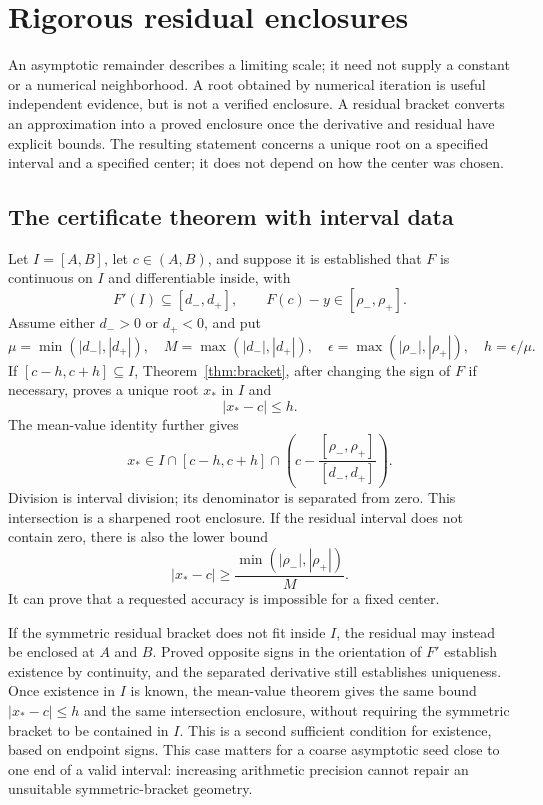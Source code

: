 \section{Rigorous residual enclosures}
\label{sec:executable-certificates}

An asymptotic remainder describes a limiting scale; it need not supply a
constant or a numerical neighborhood. A root obtained by numerical iteration
is useful independent evidence, but is not a verified enclosure.
A residual bracket converts an approximation into a proved enclosure once the derivative and residual have explicit bounds. The resulting statement concerns a unique root on a specified interval and a specified center; it does not depend on how the center was chosen.

\subsection{The certificate theorem with interval data}

Let $I=[A,B]$, let $c\in(A,B)$, and suppose it is established that $F$ is continuous on $I$ and differentiable inside, with
\[
 F'(I)\subseteq[d_-,d_+],\qquad
 F(c)-y\in[\rho_-,\rho_+].
\]
Assume either $d_->0$ or $d_+<0$, and put
\[
 \mu=\min(|d_-|,|d_+|),\quad
 M=\max(|d_-|,|d_+|),\quad
 \epsilon=\max(|\rho_-|,|\rho_+|),\quad h=\epsilon/\mu.
\]
If $[c-h,c+h]\subseteq I$, Theorem~\ref{thm:bracket}, after changing the sign
of $F$ if necessary, proves a unique root $x_*$ in $I$ and
\[
 |x_*-c|\le h.
\]
The mean-value identity further gives
\[
 x_*\in I\cap[c-h,c+h]\cap
 \left(c-\frac{[\rho_-,\rho_+]}{[d_-,d_+]}\right).
\]
Division is interval division; its denominator is separated from zero. This intersection is a sharpened root enclosure. If the residual interval
does not contain zero, there is also the lower bound
\[
 |x_*-c|\ge\frac{\min(|\rho_-|,|\rho_+|)}{M}.
\]
It can prove that a requested accuracy is impossible for a fixed center.

If the symmetric residual bracket does not fit inside $I$, the residual may instead be enclosed at $A$ and $B$. Proved opposite signs in the
orientation of $F'$ establish existence by continuity, and the separated
derivative still establishes uniqueness. Once existence in $I$ is known,
the mean-value theorem gives the same bound $|x_*-c|\le h$ and the same
intersection enclosure, without requiring the symmetric bracket to be
contained in $I$. This is a second sufficient condition for existence, based on endpoint signs. This case matters for a coarse asymptotic seed close to one
end of a valid interval: increasing arithmetic precision cannot repair
an unsuitable symmetric-bracket geometry.

